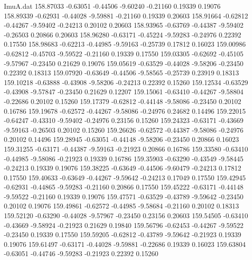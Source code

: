 \begin{filecontents}{ImuA.dat}
 158.87033   -0.63051   -0.44506   -9.60240   -0.21160    0.19339    0.19076
 158.89339   -0.62931   -0.44028   -9.59881   -0.21160    0.19339    0.20603
 158.91664   -0.62812   -0.44267   -9.59402   -0.24213    0.20102    0.20603
 158.93965   -0.63769   -0.44387   -9.59402   -0.26503    0.20866    0.20603
 158.96280   -0.63171   -0.45224   -9.59283   -0.24976    0.22392    0.17550
 158.98683   -0.62213   -0.44985   -9.59163   -0.25739    0.17812    0.16023
 159.00986   -0.62812   -0.45703   -9.59522   -0.21160    0.19339    0.17550
 159.03305   -0.62692   -0.45105   -9.57967   -0.23450    0.21629    0.19076
 159.05619   -0.63529   -0.44028   -9.58206   -0.23450    0.22392    0.18313
 159.07920   -0.63649   -0.44506   -9.58565   -0.25739    0.23919    0.18313
 159.10218   -0.63888   -0.43908   -9.58206   -0.24213    0.22392    0.15260
 159.12534   -0.63529   -0.43908   -9.57847   -0.23450    0.21629    0.12207
 159.15061   -0.63410   -0.44267   -9.58804   -0.22686    0.20102    0.15260
 159.17379   -0.62812   -0.44148   -9.58086   -0.23450    0.20102    0.16786
 159.19678   -0.62572   -0.44267   -9.58086   -0.24976    0.24682    0.14496
 159.22015   -0.64247   -0.43310   -9.59402   -0.24976    0.23156    0.15260
 159.24323   -0.63171   -0.43669   -9.59163   -0.26503    0.20102    0.15260
 159.26626   -0.62572   -0.44387   -9.58086   -0.24976    0.20102    0.14496
 159.28945   -0.63051   -0.44148   -9.58206   -0.23450    0.20866    0.16023
 159.31255   -0.63171   -0.44387   -9.59163   -0.21923    0.20866    0.16786
 159.33580   -0.63410   -0.44985   -9.58086   -0.21923    0.19339    0.16786
 159.35903   -0.63290   -0.43549   -9.58445   -0.24213    0.19339    0.19076
 159.38225   -0.63649   -0.44506   -9.60479   -0.24213    0.17812    0.17550
 159.40633   -0.63649   -0.44267   -9.59642   -0.24213    0.17049    0.17550
 159.42945   -0.62931   -0.44865   -9.59283   -0.21160    0.20866    0.17550
 159.45222   -0.63171   -0.44148   -9.59522   -0.21160    0.19339    0.19076
 159.47571   -0.63529   -0.43789   -9.59642   -0.23450    0.20102    0.19076
 159.49861   -0.62572   -0.44985   -9.58684   -0.21160    0.20102    0.18313
 159.52120   -0.63290   -0.44028   -9.57967   -0.23450    0.23156    0.20603
 159.54505   -0.63410   -0.43669   -9.58924   -0.21923    0.21629    0.19840
 159.56796   -0.62453   -0.44267   -9.59522   -0.23450    0.19339    0.17550
 159.59205   -0.62812   -0.43789   -9.59642   -0.21923    0.19339    0.19076
 159.61497   -0.63171   -0.44028   -9.59881   -0.22686    0.19339    0.16023
 159.63804   -0.63051   -0.44746   -9.59283   -0.21923    0.22392    0.15260

\end{filecontents}
